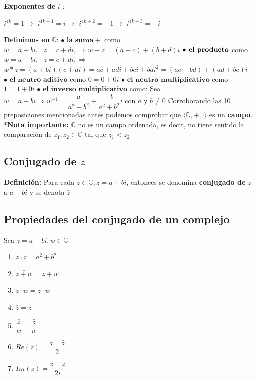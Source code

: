 \documentclass[12pt]{article}
\begin{document}
\noindent \textbf{Exponentes de }$i$ :
\begin{center}
    $i^{4k}=1\rightarrow$ 
    $i^{4k+1}=i\rightarrow$
    $i^{4k+2}=-1\rightarrow$
    $i^{4k+3}=-i$     
\end{center}
\newpage
\noindent \textbf{Definimos en } $\mathbb{C}$:\newline
$\bullet \textbf{ la suma} +$ como $w=a+bi,\text{ }z=c+di, \Rightarrow w+z=(a+c)+(b+d)i$ \newline
$\bullet \textbf{ el producto} \*$ como $w=a+bi,\text{ }z=c+di, \Rightarrow$ \newline
$w*z=(a+bi)(c+di)=ac+adi+bci+bdi^2=(ac-bd)+(ad+bc)i$\newline
$\bullet \textbf{ el neutro aditivo} $ como $0=0+0i$\newline
$\bullet \textbf{ el neutro multiplicativo} $ como $1=1+0i$\newline
$\bullet \textbf{ el inverso multiplicativo} $ como:\newline
Sea $w=a+bi \Rightarrow w^{-1}=\dfrac{a}{a^2+b^2}+\dfrac{-b}{a^2+b^2}i\text{ con } a$ y $b\not=0$\newline
Corroborando las 10 preposiciones mencionadas antes podemos comprobar que $\langle\mathbb{C}, +,\cdot\rangle$ es un \textbf{campo}.\newline
*\textbf{Nota importante: } $\mathbb{C}$ no es un campo ordenada, es decir, no tiene sentido la comparación
de $z_1,z_2\in \mathbb{C}$ tal que $z_1 < z_2$\newline
\subsection*{Conjugado de $z$}
\noindent \textbf{Definición: }Para cada $z\in\mathbb{C}, z=a+bi$, entonces se denomina
\textbf{conjugado de }$z$ a $a-bi$ y se denota $\bar{z}$
\newline
\subsection*{Propiedades del conjugado de un complejo}
Sea $z=a+bi,w\in\mathbb{C}$
\begin{enumerate}
    \item $z \cdot \bar{z}=a^2+b^2$
    \item $\bar{z+w}=\bar{z}+\bar{w}$
    \item $\bar{z\cdot w}=\bar{z}\cdot\bar{w}$
    \item $\bar{\bar{z}}=z$
    \item $\bar{\dfrac{z}{w}}=\dfrac{\bar{z}}{\bar{w}}$
    \item $Re(z)=\dfrac{z+\bar{z}}{2}$
    \item $Im(z)=\dfrac{z-\bar{z}}{2i}$
\end{enumerate}
\end{document}
